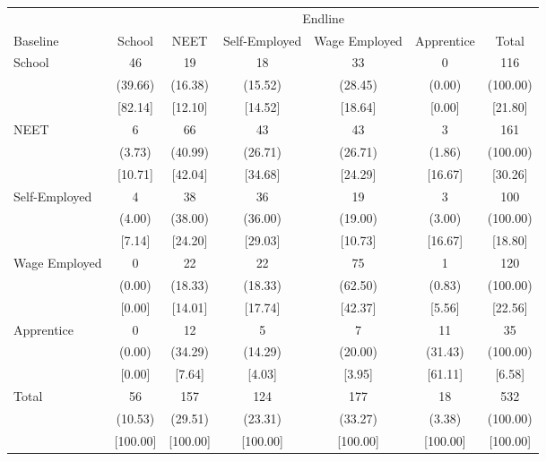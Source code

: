 {
\def\sym#1{\ifmmode^{#1}\else\(^{#1}\)\fi}
\begin{tabular}{l*{6}{c}}
\hline\hline
            &\multicolumn{6}{c}{Endline}                                                  \\
Baseline    &      School&        NEET&Self-Employed&Wage Employed&  Apprentice&       Total\\
\hline
School      &          46&          19&          18&          33&           0&         116\\
            &     (39.66)&     (16.38)&     (15.52)&     (28.45)&      (0.00)&    (100.00)\\
            &     [82.14]&     [12.10]&     [14.52]&     [18.64]&      [0.00]&     [21.80]\\
NEET        &           6&          66&          43&          43&           3&         161\\
            &      (3.73)&     (40.99)&     (26.71)&     (26.71)&      (1.86)&    (100.00)\\
            &     [10.71]&     [42.04]&     [34.68]&     [24.29]&     [16.67]&     [30.26]\\
Self-Employed&           4&          38&          36&          19&           3&         100\\
            &      (4.00)&     (38.00)&     (36.00)&     (19.00)&      (3.00)&    (100.00)\\
            &      [7.14]&     [24.20]&     [29.03]&     [10.73]&     [16.67]&     [18.80]\\
Wage Employed&           0&          22&          22&          75&           1&         120\\
            &      (0.00)&     (18.33)&     (18.33)&     (62.50)&      (0.83)&    (100.00)\\
            &      [0.00]&     [14.01]&     [17.74]&     [42.37]&      [5.56]&     [22.56]\\
Apprentice  &           0&          12&           5&           7&          11&          35\\
            &      (0.00)&     (34.29)&     (14.29)&     (20.00)&     (31.43)&    (100.00)\\
            &      [0.00]&      [7.64]&      [4.03]&      [3.95]&     [61.11]&      [6.58]\\
Total       &          56&         157&         124&         177&          18&         532\\
            &     (10.53)&     (29.51)&     (23.31)&     (33.27)&      (3.38)&    (100.00)\\
            &    [100.00]&    [100.00]&    [100.00]&    [100.00]&    [100.00]&    [100.00]\\
\hline\hline
\end{tabular}
}

